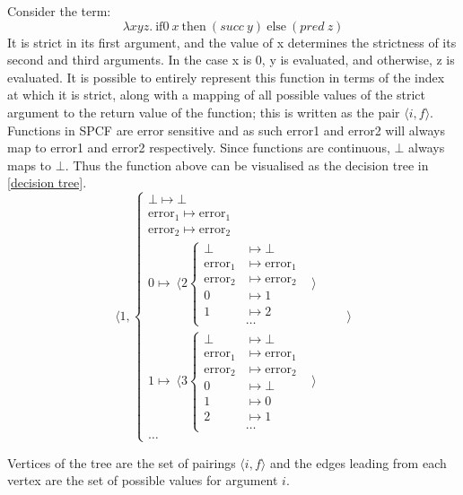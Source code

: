 \documentclass[12pt,a4paper]{report}
\theoremstyle{definition}
\theoremstyle{remark}
\begin{document}
Consider the term:
\[\lambda xyz.\ \text{if0}\ x\ \text{then}\ (succ\ y)\ \text{else}\ (pred\ z)\]
It is strict in its first argument, and the value of x determines the strictness of its second and third arguments. In the case x is 0, y is evaluated, and otherwise, z is evaluated. It is possible to entirely represent this function in terms of the index at which it is strict, along with a mapping of all possible values of the strict argument to the return value of the function; this is written as the pair $\langle i, f \rangle$. Functions in SPCF are error sensitive and as such error1 and error2 will always map to error1 and error2 respectively. Since functions are continuous, $\bot$ always maps to $\bot$. Thus the function above can be visualised as the decision tree in \eqref{decision tree}.
\begin{equation}\label{decision tree}
\langle 1, 
\begin{cases}
    \bot \mapsto \bot\\
    \text{error}_1 \mapsto \text{error}_1\\
    \text{error}_2 \mapsto \text{error}_2\\
    0 \mapsto\ \langle 2 \begin{cases}
        \bot &\mapsto \bot\\
        \text{error}_1 &\mapsto \text{error}_1\\
        \text{error}_2 &\mapsto \text{error}_2\\
        0 &\mapsto 1\\
        1 &\mapsto 2\\
          &\dots
    \end{cases} &\rangle\\
    1 \mapsto\ \langle 3 \begin{cases}
        \bot &\mapsto \bot\\
        \text{error}_1 &\mapsto \text{error}_1\\
        \text{error}_2 &\mapsto \text{error}_2\\
        0 &\mapsto \bot\\
        1 &\mapsto 0\\
        2 &\mapsto 1\\
          &\dots
    \end{cases} &\rangle\\
    \dots
\end{cases} \quad\quad\rangle    
\end{equation}

Vertices of the tree are the set of pairings  $\langle i, f \rangle$ and the edges leading from each vertex are the set of possible values for argument $i$. 
\end{document}
